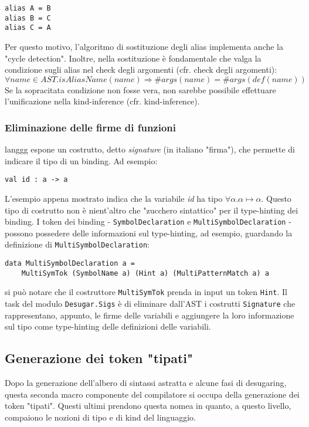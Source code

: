 \documentclass[10pt,a4paper]{article}
\begin{document}
\begin{lstlisting}
alias A = B
alias B = C
alias C = A
\end{lstlisting}

Per questo motivo, l'algoritmo di sostituzione degli alias implementa anche la "cycle detection". Inoltre, nella
sostituzione è fondamentale che valga la condizione sugli alias nel check degli argomenti (cfr. check degli argomenti):
    \[ \forall name \in AST. isAliasName(name) \Longrightarrow \#args(name) = \#args(def(name)) \]
Se la sopracitata condizione non fosse vera, non sarebbe possibile effettuare l'unificazione nella kind-inference (cfr.
kind-inference).

\subsubsection{Eliminazione delle firme di funzioni}
langgg espone un costrutto, detto \textit{signature} (in italiano "firma"), che permette di indicare il tipo di un
binding. Ad esempio:

\begin{lstlisting}
val id : a -> a
\end{lstlisting}

L'esempio appena mostrato indica che la variabile \textit{id} ha tipo $ \forall \alpha. \alpha \mapsto \alpha $. Questo
tipo di costrutto non è nient'altro che "zucchero sintattico" per il type-hinting dei binding. I token dei binding
- \texttt{SymbolDeclaration} e \texttt{MultiSymbolDeclaration} - possono possedere delle informazioni sul type-hinting,
ad esempio, guardando la definizione di \texttt{MultiSymbolDeclaration}:

\begin{lstlisting}
data MultiSymbolDeclaration a =
    MultiSymTok (SymbolName a) (Hint a) (MultiPatternMatch a) a
\end{lstlisting}

si può notare che il costruttore \texttt{MultiSymTok} prenda in input un token \texttt{Hint}. Il task del modulo
\texttt{Desugar.Sigs} è di eliminare dall'AST i costrutti \texttt{Signature} che rappresentano, appunto, le firme delle
variabili e aggiungere la loro informazione sul tipo come type-hinting delle definizioni delle variabili.

\subsection{Generazione dei token "tipati"}
Dopo la generazione dell'albero di sintassi astratta e alcune fasi di desugaring, questa seconda macro componente del
compilatore si occupa della generazione dei token "tipati". Questi ultimi prendono questa nomea in quanto, a questo
livello, compaiono le nozioni di tipo e di kind del linguaggio.
\end{document}
